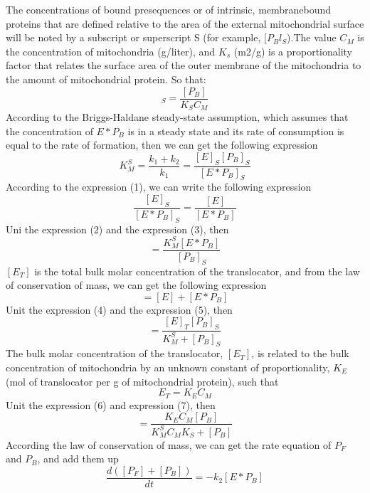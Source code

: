 \documentclass[UTF8]{ctexart}
\begin{document}
The concentrations of bound presequences or of intrinsic, membranebound proteins that are defined relative to the area of the external mitochondrial surface will be noted by a subscript or superscript S (for example, $[P_Bl_S$).The value $C_M$ is the concentration of mitochondria (g/liter), and $K_s$ (m2/g) is a proportionality factor that relates the surface area of the outer membrane of the mitochondria to the amount of mitochondrial protein. So that:
\begin{equation}
[P_B]_S=\frac{[P_B]}{K_S C_M}
\end{equation}
According to the Briggs-Haldane steady-state assumption, which assumes that the concentration of $E*P_B$ is in a steady state and its rate of consumption is equal to the rate of formation, then we can get the following expression
\begin{equation}
K_M^S=\frac{k_1+k_2}{k_1}=\frac{[E]_S [P_B]_S}{[E*P_B]_S}
\end{equation}
According to the expression (1), we can write the following expression
\begin{equation}
\frac{[E]_S}{[E*P_B]_S}=\frac{[E]}{[E*P_B]}
\end{equation}
Uni the expression (2) and the expression (3), then 
\begin{equation}
[E]=\frac{K_M^S[E*P_B]}{[P_B]_S}
\end{equation}
$[E_T]$ is the total bulk molar concentration of the translocator, and from the law of conservation of mass, we can get the following expression
\begin{equation}
[E_T]=[E]+[E*P_B]
\end{equation}
Unit the expression (4) and the expression (5), then
\begin{equation}
[E*P_B]=\frac{[E]_T[P_B]_S}{K_M^S+[P_B]_S}
\end{equation}
The bulk molar concentration of the translocator, $[E_T]$, is related to the bulk concentration of mitochondria by an unknown constant of proportionality, $K_E$ (mol of translocator per g of mitochondrial protein), such that
\begin{equation}
E_T=K_EC_M
\end{equation}
Unit the expression (6) and expression (7), then
\begin{equation}
[E*P_B]=\frac{K_EC_M[P_B]}{K_M^SC_MK_S+[P_B]}
\end{equation}
According the law of conservation of mass, we can get the rate equation of $P_F$ and $P_B$, and add them up
\begin{equation}
\frac{d([P_F]+[P_B])}{d t}=-k_2[E*P_B]
\end{equation}
\end{document}
